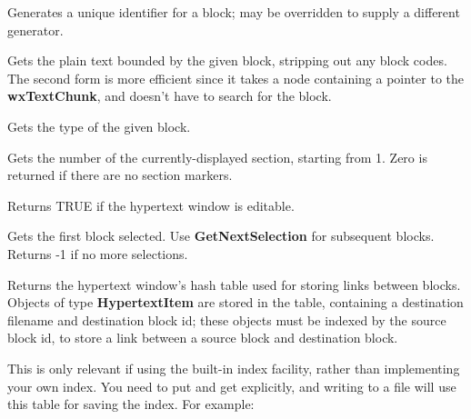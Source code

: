 Generates a unique identifier for a block; may be overridden to supply
a different generator.




Gets the plain text bounded by the given block, stripping out any
block codes.  The second form is more efficient since it takes a node
containing a pointer to the {\bf wxTextChunk}, and doesn't have to
search for the block.



Gets the type of the given block.



Gets the number of the currently-displayed section, starting from 1. Zero is returned
if there are no section markers.



Returns TRUE if the hypertext window is editable.



Gets the first block selected. Use {\bf GetNextSelection} for subsequent
blocks. Returns -1 if no more selections.



Returns the hypertext window's hash table used for storing links
between blocks. Objects of type {\bf HypertextItem} are stored in the
table, containing a destination filename and destination block id;
these objects must be indexed by the source block id, to store a link
between a source block and destination block.

This is only relevant if using the built-in index facility, rather than
implementing your own index. You need to put and get explicitly, and writing
to a file will use this table for saving the index. For example:

